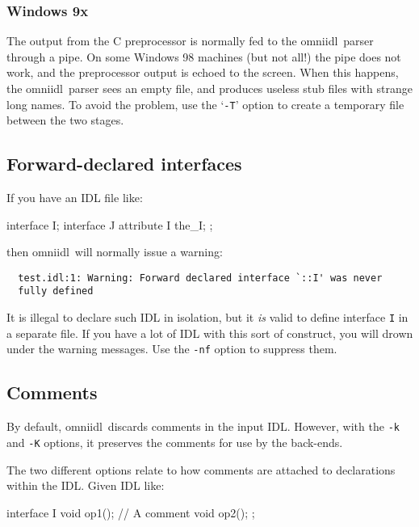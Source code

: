 \documentclass[11pt,twoside,a4paper]{article}
\newcommand{\omniidl}{\textsf{omniidl}}
\newcommand{\intf}[1]{\texttt{#1}}
\newcommand{\cmdline}[1]{\texttt{#1}}
\begin{document}
\subsubsection{Windows 9x}

The output from the C preprocessor is normally fed to the \omniidl\
parser through a pipe. On some Windows 98 machines (but not all!)  the
pipe does not work, and the preprocessor output is echoed to the
screen. When this happens, the \omniidl\ parser sees an empty file,
and produces useless stub files with strange long names. To avoid the
problem, use the `\cmdline{-T}' option to create a temporary file
between the two stages.


\subsection{Forward-declared interfaces}

If you have an IDL file like:

\begin{idllisting}
interface I;
interface J {
  attribute I the_I;
};
\end{idllisting}

\noindent then \omniidl\ will normally issue a warning:

{\small
\begin{verbatim}
  test.idl:1: Warning: Forward declared interface `::I' was never
  fully defined
\end{verbatim}
}

\noindent It is illegal to declare such IDL in isolation, but it
\emph{is} valid to define interface \intf{I} in a separate file. If
you have a lot of IDL with this sort of construct, you will drown
under the warning messages. Use the \cmdline{-nf} option to suppress
them.


\subsection{Comments}
\label{sec:comments}

By default, \omniidl\ discards comments in the input IDL. However,
with the \cmdline{-k} and \cmdline{-K} options, it preserves the
comments for use by the back-ends.

The two different options relate to how comments are attached to
declarations within the IDL. Given IDL like:

\begin{idllisting}
interface I {
  void op1();
  // A comment
  void op2();
};
\end{idllisting}
\end{document}
